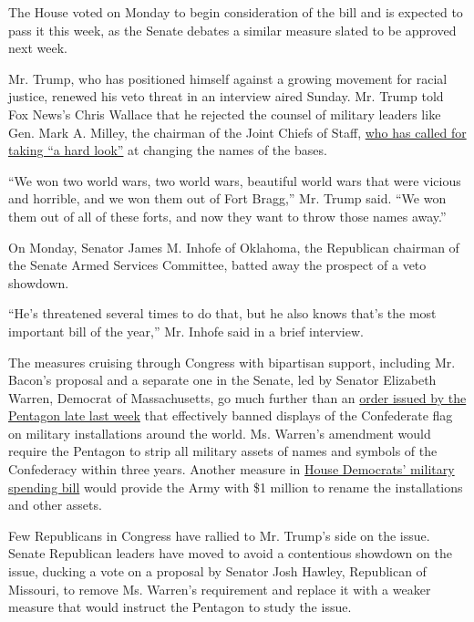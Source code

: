 The House voted on Monday to begin consideration of the bill and is
expected to pass it this week, as the Senate debates a similar measure
slated to be approved next week.

Mr. Trump, who has positioned himself against a growing movement for
racial justice, renewed his veto threat in an interview aired Sunday.
Mr. Trump told Fox News's Chris Wallace that he rejected the counsel of
military leaders like Gen. Mark A. Milley, the chairman of the Joint
Chiefs of Staff,
\href{https://www.nytimes.com/2020/07/09/us/politics/milley-trump-confederate-base-names.html}{who
has called for taking ``a hard look''} at changing the names of the
bases.

``We won two world wars, two world wars, beautiful world wars that were
vicious and horrible, and we won them out of Fort Bragg,'' Mr. Trump
said. ``We won them out of all of these forts, and now they want to
throw those names away.''

On Monday, Senator James M. Inhofe of Oklahoma, the Republican chairman
of the Senate Armed Services Committee, batted away the prospect of a
veto showdown.

``He's threatened several times to do that, but he also knows that's the
most important bill of the year,'' Mr. Inhofe said in a brief interview.

The measures cruising through Congress with bipartisan support,
including Mr. Bacon's proposal and a separate one in the Senate, led by
Senator Elizabeth Warren, Democrat of Massachusetts, go much further
than an
\href{https://www.nytimes.com/2020/07/17/us/politics/pentagon-trump-confederate-symbols.html}{order
issued by the Pentagon late last week} that effectively banned displays
of the Confederate flag on military installations around the world. Ms.
Warren's amendment would require the Pentagon to strip all military
assets of names and symbols of the Confederacy within three years.
Another measure in
\href{https://appropriations.house.gov/news/press-releases/appropriations-committee-releases-fiscal-year-2021-defense-funding-bill}{House
Democrats' military spending bill} would provide the Army with \$1
million to rename the installations and other assets.

Few Republicans in Congress have rallied to Mr. Trump's side on the
issue. Senate Republican leaders have moved to avoid a contentious
showdown on the issue, ducking a vote on a proposal by Senator Josh
Hawley, Republican of Missouri, to remove Ms. Warren's requirement and
replace it with a weaker measure that would instruct the Pentagon to
study the issue.

